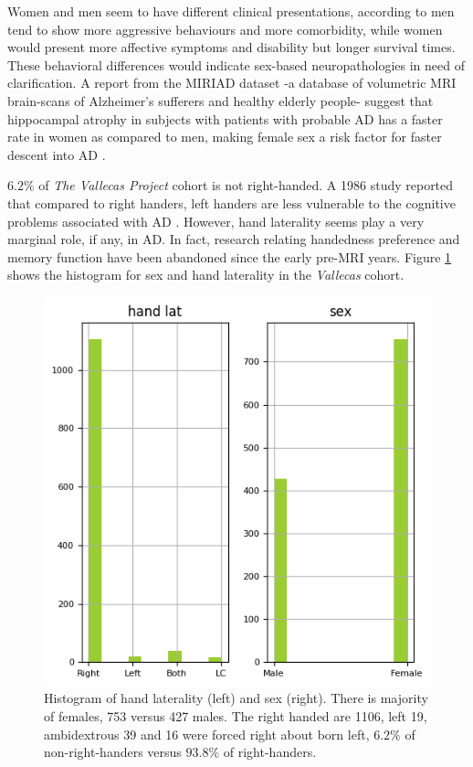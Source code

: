 \documentclass[11pt]{article}
\theoremstyle{definition}
\theoremstyle{remark}
\begin{document}
Women and men seem to have different clinical presentations, according to \cite{sinforiani2010impact} men tend to show more aggressive behaviours and more comorbidity, while women would present more affective symptoms and disability but longer survival times. These behavioral differences would indicate sex-based neuropathologies in need of clarification. A report from the MIRIAD dataset \cite{malone2013miriad} -a database of volumetric MRI brain-scans of Alzheimer's sufferers and healthy elderly people- suggest that hippocampal atrophy in subjects with patients with probable AD has a faster rate in women as compared to men, making female sex a risk factor for faster descent into AD \cite{ardekani2016analysis}.

$6.2\%$ of \emph{The Vallecas Project} cohort is not right-handed. A 1986 study reported that compared to right handers, left handers are less vulnerable to the cognitive problems associated with AD \cite{de1986reduced}. However, hand laterality seems play a very marginal role, if any, in AD. In fact, research relating handedness preference and memory function have been abandoned since the early pre-MRI years. Figure \ref{fig:sexlat} shows the histogram for sex and hand laterality in the \emph{Vallecas} cohort.
\begin{figure}[H]
        \centering
        \includegraphics[keepaspectratio, width=.6\linewidth]{figures/Fig_sexlat}
        \caption{Histogram of hand laterality (left) and sex (right). There is majority of females, 753 versus 427 males. The right handed are 1106, left 19, ambidextrous 39 and 16 were forced right about born left,  $6.2\%$ of non-right-handers versus $93.8\%$ of right-handers.} 
        \label{fig:sexlat}
\end{figure}
\end{document}
